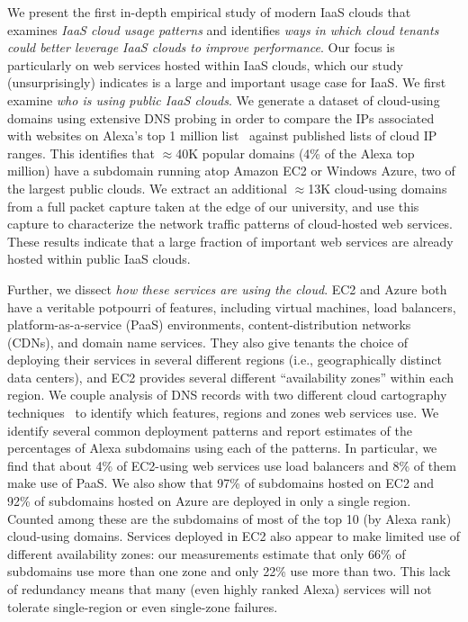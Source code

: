 We present the first in-depth empirical study of modern IaaS clouds that
examines {\em IaaS cloud usage patterns} and identifies {\em ways in which
cloud tenants could better leverage IaaS clouds to improve performance}. Our focus is particularly
on web services hosted within IaaS clouds, which our study (unsurprisingly)
indicates is a large and important usage case for IaaS.
We first examine {\em who is using public IaaS clouds}. We generate a dataset
of cloud-using domains using extensive DNS probing in order to compare the IPs
associated with websites on Alexa's top 1 million list~\cite{alex_topdomains}
against published lists of cloud IP ranges.  This identifies
that $\approx$40K
popular domains (4\% of the Alexa top million) have a subdomain
running atop Amazon EC2 or Windows Azure, two of the largest public clouds.
We extract an additional $\approx$13K cloud-using domains from a full
packet capture taken at the edge of our university, and use this capture
to characterize the network traffic patterns of cloud-hosted web services.
These results indicate that a large fraction of important web services are already
hosted within public IaaS clouds.

Further, we dissect {\em how these services are using the
  cloud}. EC2 and Azure both have a veritable potpourri of features,
including virtual machines, load balancers, platform-as-a-service
(PaaS) environments, content-distribution networks (CDNs), and domain
name services. They also give tenants the choice of deploying their
services in several different regions (i.e., geographically distinct
data centers), and EC2 provides several different ``availability
zones'' within each region. We couple analysis of DNS records with
two different cloud cartography techniques~\cite{ristenpart2009hey} to
identify which features, regions and zones web services use. We
identify several common \frontend deployment patterns and report
estimates of the percentages of Alexa subdomains using each of the
patterns. In particular, we find that about 4\% of
EC2-using web services use load balancers and 8\% of them
make use of PaaS. 
We also show that 97\% of subdomains hosted on EC2 and 92\% of
subdomains hosted on Azure are deployed in only a single region.
Counted among these are the subdomains of most of the top 10 (by Alexa
rank) cloud-using domains. Services deployed in EC2 also appear to
make limited use of different availability zones: our measurements
estimate that only 66\% of subdomains use more than one zone and only
22\% use more than two. This lack of redundancy means that many (even
highly ranked Alexa) services will not tolerate single-region or even
single-zone failures.

